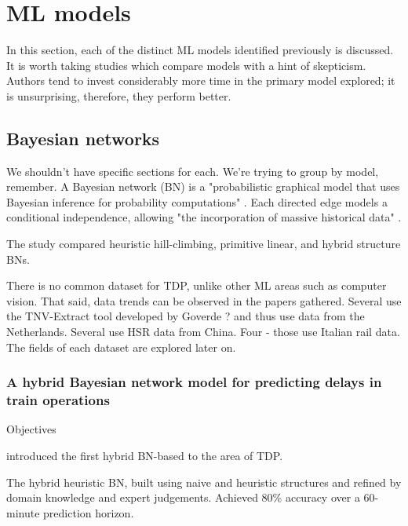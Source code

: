 \documentclass{article}
\begin{document}
\section{ML models}

In this section, each of the distinct ML models identified previously is discussed. It is worth taking studies which compare models with a hint of skepticism. Authors tend to invest considerably more time in the primary model explored; it is unsurprising, therefore, they perform better.


\subsection{Bayesian networks}

We shouldn't have specific sections for each. We're trying to group by model, remember. 
A Bayesian network (BN) is a "probabilistic graphical model that uses Bayesian inference for probability computations" \cite{towards_data_science_BN_intro}. Each directed edge models a conditional independence, allowing "the incorporation of massive historical data" \cite{lessan_fu_wen_2019}.

The study compared heuristic hill-climbing, primitive linear, and hybrid structure BNs.

There is no common dataset for TDP, unlike other ML areas such as computer vision. That said, data trends can be observed in the papers gathered. Several use the TNV-Extract tool developed by Goverde ? and thus use data from the Netherlands. Several use HSR data from China. Four - those use Italian rail data. The fields of each dataset are explored later on. 

\subsubsection{A hybrid Bayesian network model for predicting delays in train operations \cite{lessan_fu_wen_2019}}

Objectives

 introduced the first hybrid BN-based to the area of TDP. 

The hybrid heuristic BN, built using naive and heuristic structures and refined by domain knowledge and expert judgements.
Achieved 80\% accuracy over a 60-minute prediction horizon. 
\end{document}

